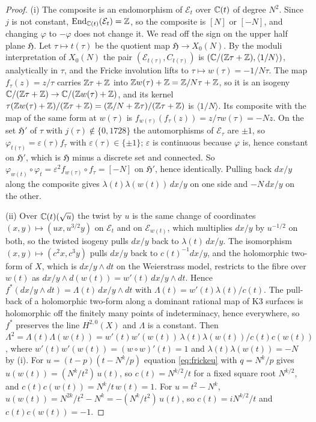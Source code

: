 \begin{proof}
(i) The composite is an endomorphism of $\mathcal{E}_{t}$ over $\mathbb{C}(t)$ of degree $N^{2}$. Since $j$ is not constant, $\mathrm{End}_{\mathbb{C}(t)}(\mathcal{E}_{t})=\mathbb{Z}$, so the composite is $[N]$ or $[-N]$, and changing $\varphi$ to $-\varphi$ does not change it. We read off the sign on the upper half plane $\mathfrak{H}$. Let $\tau\mapsto t(\tau)$ be the quotient map $\mathfrak{H}\to X_{0}(N)$. By the moduli interpretation of $X_{0}(N)$ the pair $(\mathcal{E}_{t(\tau)},C_{t(\tau)})$ is $(\mathbb{C}/(\mathbb{Z}\tau+\mathbb{Z}),\langle1/N\rangle)$, analytically in $\tau$, and the Fricke involution lifts to $\tau\mapsto w(\tau)=-1/N\tau$. The map $f_{\tau}(z)=z/\tau$ carries $\mathbb{Z}\tau+\mathbb{Z}$ into $\mathbb{Z} w(\tau)+\mathbb{Z}=\mathbb{Z}/N\tau+\mathbb{Z}$, so it is an isogeny $\mathbb{C}/(\mathbb{Z}\tau+\mathbb{Z})\to\mathbb{C}/(\mathbb{Z} w(\tau)+\mathbb{Z})$, and its kernel $\tau(\mathbb{Z} w(\tau)+\mathbb{Z})/(\mathbb{Z}\tau+\mathbb{Z})=(\mathbb{Z}/N+\mathbb{Z}\tau)/(\mathbb{Z}\tau+\mathbb{Z})$ is $\langle1/N\rangle$. Its composite with the map of the same form at $w(\tau)$ is $f_{w(\tau)}(f_{\tau}(z))=z/\tau w(\tau)=-Nz$. On the set $\mathfrak{H}'$ of $\tau$ with $j(\tau)\notin\{0,1728\}$ the automorphisms of $\mathcal{E}_{\tau}$ are $\pm1$, so $\varphi_{t(\tau)}=\varepsilon(\tau)f_{\tau}$ with $\varepsilon(\tau)\in\{\pm1\}$; $\varepsilon$ is continuous because $\varphi$ is, hence constant on $\mathfrak{H}'$, which is $\mathfrak{H}$ minus a discrete set and connected. So $\varphi_{w(t)}\circ\varphi_{t}=\varepsilon^{2}f_{w(\tau)}\circ f_{\tau}=[-N]$ on $\mathfrak{H}'$, hence identically. Pulling back $dx/y$ along the composite gives $\lambda(t)\lambda(w(t))\,dx/y$ on one side and $-N\,dx/y$ on the other.

(ii) Over $\mathbb{C}(t)(\sqrt u)$ the twist by $u$ is the same change of coordinates $(x,y)\mapsto(ux,u^{3/2}y)$ on $\mathcal{E}_{t}$ and on $\mathcal{E}_{w(t)}$, which multiplies $dx/y$ by $u^{-1/2}$ on both, so the twisted isogeny pulls $dx/y$ back to $\lambda(t)\,dx/y$. The isomorphism $(x,y)\mapsto(c^{2}x,c^{3}y)$ pulls $dx/y$ back to $c(t)^{-1}dx/y$, and the holomorphic two-form of $X$, which is $dx/y\wedge dt$ on the Weierstrass model, restricts to the fibre over $w(t)$ as $dx/y\wedge d(w(t))=w'(t)\,dx/y\wedge dt$. Hence $f^{*}(dx/y\wedge dt)=\Lambda(t)\,dx/y\wedge dt$ with $\Lambda(t)=w'(t)\lambda(t)/c(t)$. The pull-back of a holomorphic two-form along a dominant rational map of K3 surfaces is holomorphic off the finitely many points of indeterminacy, hence everywhere, so $f^{*}$ preserves the line $H^{2,0}(X)$ and $\Lambda$ is a constant. Then $\Lambda^{2}=\Lambda(t)\Lambda(w(t))=w'(t)w'(w(t))\,\lambda(t)\lambda(w(t))/c(t)c(w(t))$, where $w'(t)w'(w(t))=(w\circ w)'(t)=1$ and $\lambda(t)\lambda(w(t))=-N$ by (i). For $u=(t-p)(t-N^{k}/p)$ equation \eqref{eq:frickeu} with $q=N^{k}/p$ gives $u(w(t))=(N^{k}/t^{2})\,u(t)$, so $c(t)=N^{k/2}/t$ for a fixed square root $N^{k/2}$, and $c(t)c(w(t))=N^{k}/t\,w(t)=1$. For $u=t^{2}-N^{k}$, $u(w(t))=N^{2k}/t^{2}-N^{k}=-(N^{k}/t^{2})\,u(t)$, so $c(t)=iN^{k/2}/t$ and $c(t)c(w(t))=-1$.
\end{proof}


